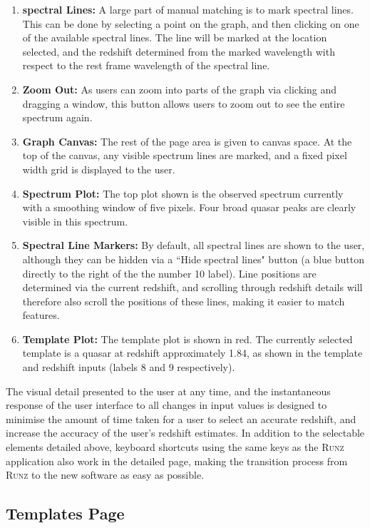 \documentclass[titlesmallcaps, examinerscopy, copyrightpage]{uqthesis}
\newcommand{\runz}{\textsc{Runz}}
\begin{document}
\begin{enumerate}
\item \textbf{spectral Lines:} A large part of manual matching is to mark spectral lines. This can be done by selecting a point on the graph, and then clicking on one of the available spectral lines. The line will be marked at the location selected, and the redshift determined from the marked wavelength with respect to the rest frame wavelength of the spectral line.
\item \textbf{Zoom Out:} As users can zoom into parts of the graph via clicking and dragging a window, this button allows users to zoom out to see the entire spectrum again.
\item \textbf{Graph Canvas:} The rest of the page area is given to canvas space. At the top of the canvas, any visible spectrum lines are marked, and a fixed pixel width grid is displayed to the user.
\item \textbf{Spectrum Plot:} The top plot shown is the observed spectrum currently with a smoothing window of five pixels. Four broad quasar peaks are clearly visible in this spectrum.
\item \textbf{Spectral Line Markers:} By default, all spectral lines are shown to the user, although they can be hidden via a ``Hide spectral lines" button (a blue button directly to the right of the the number 10 label). Line positions are determined via the current redshift, and scrolling through redshift details will therefore also scroll the positions of these lines, making it easier to match features.
\item \textbf{Template Plot:} The template plot is shown in red. The currently selected template is a quasar at redshift approximately 1.84, as shown in the template and redshift inputs (labels 8 and 9 respectively).
\end{enumerate}

The visual detail presented to the user at any time, and the instantaneous response of the user interface to all changes in input values is designed to minimise the amount of time taken for a user to select an accurate redshift, and increase the accuracy of the user's redshift estimates. In addition to the selectable elements detailed above, keyboard shortcuts using the same keys as the \runz{} application also work in the detailed page, making the transition process from \runz{} to the new software as easy as possible.

\pagebreak
\subsection{Templates Page}
\end{document}

